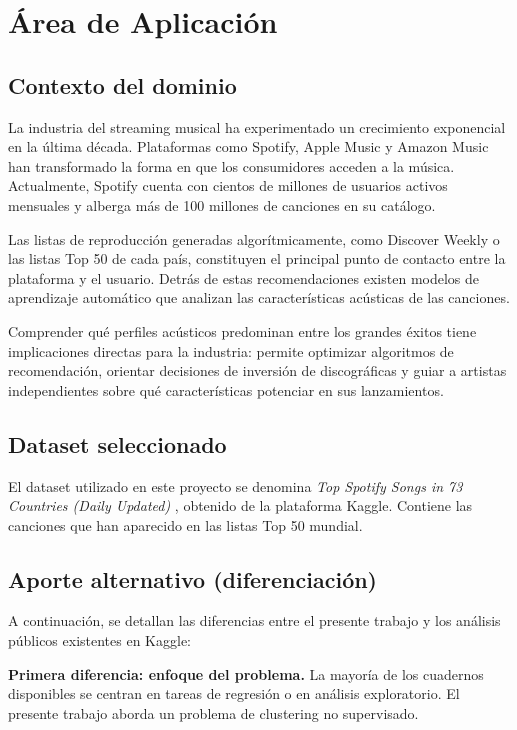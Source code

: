 \section{Área de Aplicación}

\subsection{Contexto del dominio}

La industria del streaming musical ha experimentado un crecimiento exponencial en la última década. Plataformas como Spotify, Apple Music y Amazon Music han transformado la forma en que los consumidores acceden a la música. Actualmente, Spotify cuenta con cientos de millones de usuarios activos mensuales y alberga más de 100 millones de canciones en su catálogo.

Las listas de reproducción generadas algorítmicamente, como Discover Weekly o las listas Top 50 de cada país, constituyen el principal punto de contacto entre la plataforma y el usuario. Detrás de estas recomendaciones existen modelos de aprendizaje automático que analizan las características acústicas de las canciones.

Comprender qué perfiles acústicos predominan entre los grandes éxitos tiene implicaciones directas para la industria: permite optimizar algoritmos de recomendación, orientar decisiones de inversión de discográficas y guiar a artistas independientes sobre qué características potenciar en sus lanzamientos.

\subsection{Dataset seleccionado}

El dataset utilizado en este proyecto se denomina \textit{Top Spotify Songs in 73 Countries (Daily Updated)} \cite{asaniczka2025}, obtenido de la plataforma Kaggle. Contiene las canciones que han aparecido en las listas Top 50 mundial.

\subsection{Aporte alternativo (diferenciación)}

A continuación, se detallan las diferencias entre el presente trabajo y los análisis públicos existentes en Kaggle:

\textbf{Primera diferencia: enfoque del problema.} La mayoría de los cuadernos disponibles se centran en tareas de regresión o en análisis exploratorio. El presente trabajo aborda un problema de clustering no supervisado.

